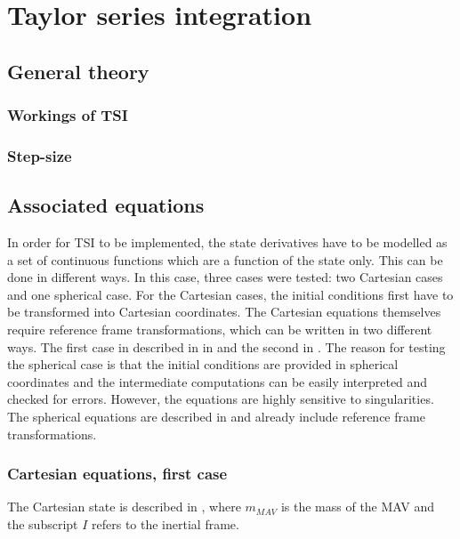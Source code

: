 \chapter{Taylor series integration} %
\label{ch:tsi}

\section{General theory}
\label{sec:genTsiTheory}

\subsection{Workings of \ac{TSI}}
\label{subsec:workTsi}

\subsection{Step-size}
\label{subsec:stepSizeTsi}

\section{Associated equations}
\label{sec:assEq}
In order for \ac{TSI} to be implemented, the state derivatives have to be modelled as a set of continuous functions which are a function of the state only. This can be done in different ways. In this case, three cases were tested: two Cartesian cases and one spherical case. For the Cartesian cases, the initial conditions first have to be transformed into Cartesian coordinates. The Cartesian equations themselves require reference frame transformations, which can be written in two different ways. The first case in described in in  and the second in . The reason for testing the spherical case is that the initial conditions are provided in spherical coordinates and the intermediate computations can be easily interpreted and checked for errors. However, the equations are highly sensitive to singularities. The spherical equations are described in  and already include reference frame transformations. 

\subsection{Cartesian equations, first case}
\label{subsec:careq}
The Cartesian state is described in , where $m_{MAV}$ is the mass of the \ac{MAV} and the subscript $I$ refers to the inertial frame.

